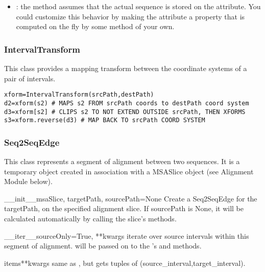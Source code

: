 \documentclass{howto}
\begin{document}
\begin{itemize}
\item
{}: the  method assumes that 
the actual sequence is stored
on the  attribute.  You could customize this behavior by 
making the  attribute a property that is computed on the fly
by some method of your own.

\end{itemize}


\subsubsection{IntervalTransform}
This class provides a mapping transform between the coordinate
systems of a pair of intervals.

\begin{verbatim}
xform=IntervalTransform(srcPath,destPath)
d2=xform(s2) # MAPS s2 FROM srcPath coords to destPath coord system
d3=xform[s2] # CLIPS s2 TO NOT EXTEND OUTSIDE srcPath, THEN XFORMS
s3=xform.reverse(d3) # MAP BACK TO srcPath COORD SYSTEM
\end{verbatim}

\subsubsection{Seq2SeqEdge}
This class represents a segment of alignment between two sequences.
It is a temporary object created in association with a MSASlice
object (see Alignment Module below).

\begin{funcdesc}{__init__}{msaSlice, targetPath, sourcePath=None}
  Create a Seq2SeqEdge for the targetPath, on the specified alignment
  slice.  If sourcePath is None, it will be calculated automatically
  by calling the slice's methods.
\end{funcdesc}

\begin{funcdesc}{__iter__}{sourceOnly=True, **kwargs}
  iterate over source intervals within this segment of alignment.
   will be passed on to the 's 
   and  methods.
\end{funcdesc}

\begin{funcdesc}{items}{**kwargs}
  same as , but gets tuples of (source_interval,target_interval).
\end{funcdesc}
\end{document}
